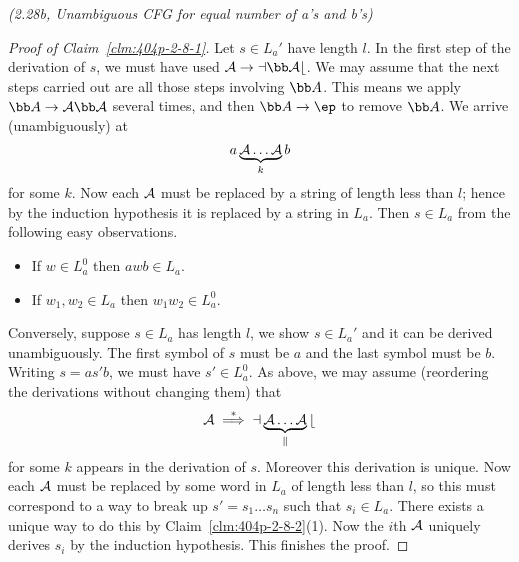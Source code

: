 \begin{problem}{\it (2.28b, Unambiguous CFG for equal number of a's and b's)}
\begin{proof}[Proof of Claim~\ref{clm:404p-2-8-1}]
Let $s\in L_a'$ have length $l$. In the first step of the derivation of $s$, we must have used $\cal A\to a\bb Ab$. %
We may assume that the next steps carried out are all those steps involving $\bb A$. This means we apply $\bb A\to \cal A \bb A$ several times, and then $\bb A\to \ep$ to remove $\bb A$. We arrive (unambiguously) at
\[
a\underbrace{\cal A\ldots \cal A}_{k}b
\]
for some $k$. Now each $\cal A$ must be replaced by a string of length less than $l$; hence by the induction hypothesis it is replaced by a string in $L_a$. Then $s\in L_a$ from the following easy observations.
\begin{itemize}
\item
If $w\in L_a^0$ then $awb\in L_a$.
\item
If $w_1,w_2\in L_a$ then $w_1w_2\in L_a^0$. 
\end{itemize}

Conversely, suppose $s\in L_a$ has length $l$, we show $s\in L_a'$ and it can be derived unambiguously. The first symbol of $s$ must be $a$ and the last symbol must be $b$. Writing $s=as'b$, we must have $s'\in L_a^0$.
As above, we may assume (reordering the derivations without changing them) that 
\[
\cal A\stackrel{*}{\implies} a\underbrace{\cal A\ldots \cal A}_{k}b
\]
for some $k$ appears in the derivation of $s$. Moreover this derivation is unique. Now each $\cal A$ must be replaced by some word in $L_a$ of length less than $l$, so this must correspond to a way to break up $s'=s_1\ldots s_n$ such that $s_i\in L_a$. There exists a unique way to do this by Claim~\ref{clm:404p-2-8-2}(1). Now the $i$th $\cal A$ uniquely derives $s_i$ by the induction hypothesis. This finishes the proof.
\end{proof}


\end{problem}
